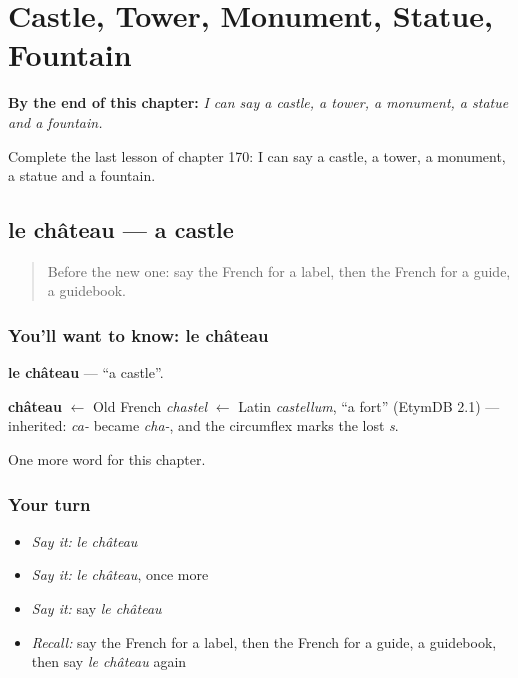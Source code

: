 
\chapter{Castle, Tower, Monument, Statue, Fountain}
\label{ch:fr-castle-tower-monument-statue-fountain}

\begin{chapteropening}
\textbf{By the end of this chapter:} \emph{I can say a castle, a tower, a monument, a statue and a fountain.}

Complete the last lesson of chapter 170: I can say a castle, a tower, a monument, a statue and a fountain.
\end{chapteropening}

\section[le château]{le château — a castle}

\label{lesson:FR-C170-chateau}



\begin{quote}
Before the new one: say the French for a label, then the French for a guide, a guidebook.
\end{quote}

\subsection*{You'll want to know: le château}
\textbf{le château} — \textquotedblleft{}a castle\textquotedblright{}.

\begin{cousinweb}
\textbf{château} $\leftarrow$ Old French \emph{chastel} $\leftarrow$ Latin \emph{castellum}, \textquotedblleft{}a fort\textquotedblright{} (EtymDB 2.1) — inherited: \emph{ca-} became \emph{cha-}, and the circumflex marks the lost \emph{s}.
\end{cousinweb}

\begin{grammarlens}[title={What you've built}]
One more word for this chapter.
\end{grammarlens}

\subsection*{Your turn}
\begin{itemize}
\raggedright
  \item \emph{Say it:} \emph{le château}
  \item \emph{Say it:} \emph{le château}, once more
  \item \emph{Say it:} say \emph{le château}
  \item \emph{Recall:} say the French for a label, then the French for a guide, a guidebook, then say \emph{le château} again
\end{itemize}

